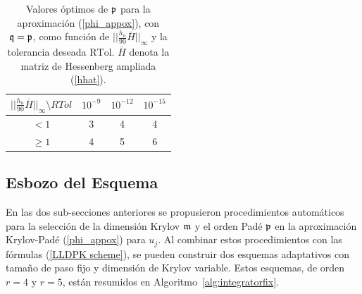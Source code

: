 \begin{table}[htb]
	\caption{Valores óptimos de $\mathfrak{p}$ para la aproximación (\ref{phi_appox}), con $\mathfrak{q}=\mathfrak{p}$, como función de $\lvert\lvert \frac{h_n}{90}\overline{H} \rvert\rvert_\infty$ y la tolerancia deseada $\mathrm{RTol}$. $\overline{H}$ denota la matriz de Hessenberg ampliada (\ref{hhat}).}
	\begin{center}
		\begin{tabular}{cccc}
			\hline
			$\lvert\lvert \frac{h_n}{90}\overline{H} \rvert\rvert_\infty \setminus RTol$ & $10^{-9}$ & $10^{-12}$ & $10^{-15}$ \\
			\hline
			$<1$ & 3 & 4 & 4 \\
			$\geq 1$ & 4 & 5 & 6 \\
			\hline
		\end{tabular}
		\label{table:padep}
	\end{center}
\end{table}

\subsection{Esbozo del Esquema}

En las dos sub-secciones anteriores se propusieron procedimientos automáticos para la selección de la dimensión Krylov $\mathfrak{m}$ y el orden Padé $\mathfrak{p}$ en la aproximación Krylov-Padé (\ref{phi_appox}) para $u_j$. Al combinar estos procedimientos con las fórmulas (\ref{LLDPK scheme}), se pueden construir dos esquemas adaptativos con tamaño de paso fijo y dimensión de Krylov variable. Estos esquemas, de orden $r=4$ y $r=5$, están resumidos en Algoritmo~\ref{alg:integratorfix}.

